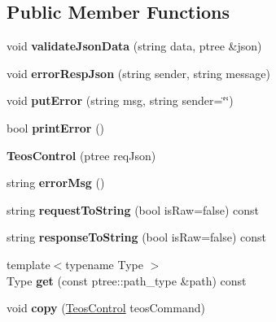 \subsection*{Public Member Functions}
\begin{DoxyCompactItemize}
\item 
\mbox{\label{classteos_1_1_teos_control_aaa5b0b70263ef6f963636dc43230ef33}} 
void {\bfseries validate\+Json\+Data} (string data, ptree \&json)
\item 
\mbox{\label{classteos_1_1_teos_control_abe614f0745845a707ec5c4e0457ebcc0}} 
void {\bfseries error\+Resp\+Json} (string sender, string message)
\item 
\mbox{\label{classteos_1_1_teos_control_ad5d500a5c6027ab6c4c9edee0affcf0c}} 
void {\bfseries put\+Error} (string msg, string sender=\char`\"{}\char`\"{})
\item 
\mbox{\label{classteos_1_1_teos_control_a005069a333bfa46592633d1bdb1df308}} 
bool {\bfseries print\+Error} ()
\item 
\mbox{\label{classteos_1_1_teos_control_a52f86bb515d91acf6cfdccd3fc766187}} 
{\bfseries Teos\+Control} (ptree req\+Json)
\item 
\mbox{\label{classteos_1_1_teos_control_af23d4fb6c90c83e47bc6917b3add9da7}} 
string {\bfseries error\+Msg} ()
\item 
\mbox{\label{classteos_1_1_teos_control_af14d89eea741cfc345db34bd2ba75d0b}} 
string {\bfseries request\+To\+String} (bool is\+Raw=false) const
\item 
\mbox{\label{classteos_1_1_teos_control_a5a4f418dfe30ab50fb373e341b9974db}} 
string {\bfseries response\+To\+String} (bool is\+Raw=false) const
\item 
\mbox{\label{classteos_1_1_teos_control_ae5781470510c9bb90a3ef0917e72b1b8}} 
{\footnotesize template$<$typename Type $>$ }\\Type {\bfseries get} (const ptree\+::path\+\_\+type \&path) const
\item 
\mbox{\label{classteos_1_1_teos_control_aa318124d7a906e4b1391fae5ad50cfb0}} 
void {\bfseries copy} (\mbox{\hyperlink{classteos_1_1_teos_control}{Teos\+Control}} teos\+Command)
\end{DoxyCompactItemize}

